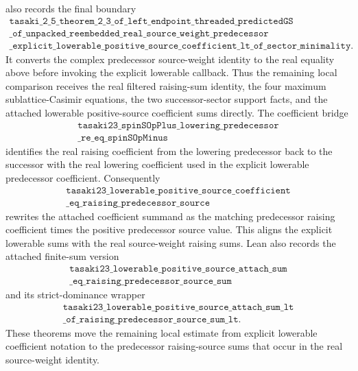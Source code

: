 \documentclass[a4paper,11pt]{article}
\begin{document}
also records the final boundary
\[
\begin{gathered}
\texttt{tasaki\_2\_5\_theorem\_2\_3\_of\_left\_endpoint\_threaded\_predictedGS}\\
\texttt{\_of\_unpacked\_reembedded\_real\_source\_weight\_predecessor}\\
\texttt{\_explicit\_lowerable\_positive\_source\_coefficient\_lt\_of\_sector\_minimality}.
\end{gathered}
\]
It converts the complex predecessor source-weight identity to the real
equality above before invoking the explicit lowerable callback.  Thus
the remaining local comparison receives the real filtered raising-sum
identity, the four maximum sublattice-Casimir equations, the two
successor-sector support facts, and the attached lowerable
positive-source coefficient sums directly.
The coefficient bridge
\[
\begin{gathered}
\texttt{tasaki23\_spinSOpPlus\_lowering\_predecessor}\\
\texttt{\_re\_eq\_spinSOpMinus}
\end{gathered}
\]
identifies the real raising coefficient from the lowering predecessor
back to the successor with the real lowering coefficient used in the
explicit lowerable predecessor coefficient.  Consequently
\[
\begin{gathered}
\texttt{tasaki23\_lowerable\_positive\_source\_coefficient}\\
\texttt{\_eq\_raising\_predecessor\_source}
\end{gathered}
\]
rewrites the attached coefficient summand as the matching predecessor
raising coefficient times the positive predecessor source value.  This
aligns the explicit lowerable sums with the real source-weight
raising sums.
Lean also records the attached finite-sum version
\[
\begin{gathered}
\texttt{tasaki23\_lowerable\_positive\_source\_attach\_sum}\\
\texttt{\_eq\_raising\_predecessor\_source\_sum}
\end{gathered}
\]
and its strict-dominance wrapper
\[
\begin{gathered}
\texttt{tasaki23\_lowerable\_positive\_source\_attach\_sum\_lt}\\
\texttt{\_of\_raising\_predecessor\_source\_sum\_lt}.
\end{gathered}
\]
These theorems move the remaining local estimate from explicit
lowerable coefficient notation to the predecessor raising-source sums
that occur in the real source-weight identity.
\end{document}
